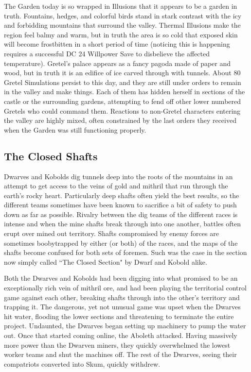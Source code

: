 The Garden today is so wrapped in Illusions that it appears to be a garden in truth. Fountains, hedges, and colorful birds stand in stark contrast with the icy and forbidding mountains that surround the valley. Thermal Illusions make the region feel balmy and warm, but in truth the area is so cold that exposed skin will become frostbitten in a short period of time (noticing this is happening requires a successful DC 24 Willpower Save to disbelieve the affected temperature). Gretel's palace appears as a fancy pagoda made of paper and wood, but in truth it is an edifice of ice carved through with tunnels. About 80 Gretel Simulations persist to this day, and they are still under orders to remain in the valley and make things. Each of them has hidden herself in sections of the castle or the surrounding gardens, attempting to fend off other lower numbered Gretels who could command them. Reactions to non-Gretel characters entering the valley are highly mixed, often constrained by the last orders they received when the Garden was still functioning properly.

\subsection{The Closed Shafts}

Dwarves and Kobolds dig tunnels deep into the roots of the mountains in an attempt to get access to the veins of gold and mithril that run through the earth's rocky heart. Particularly deep shafts often yield the best results, so the different teams sometimes have been known to sacrifice a bit of safety to push down as far as possible. Rivalry between the dig teams of the different races is intense and when the mine shafts break through into one another, battles often erupt over mined out territory. Shafts compromised by enemy forces are sometimes boobytrapped by either (or both) of the races, and the maps of the shafts become confused for both sets of foremen. Such was the case in the section now simply called ``The Closed Section" by Dwarf and Kobold alike.

Both the Dwarves and Kobolds had been digging into what promised to be an exceptionally rich vein of mithril ore, and had been playing the territorial control game against each other, breaking shafts through into the other's territory and trapping it. The dangerous, yet not unusual game was upset when the Dwarves hit water, flooding the lower sections and threatening to terminate the entire project. Undaunted, the Dwarves began setting up machinery to pump the water out. Once that started coming online, the Aboleth attacked. Having massively more power than the Dwarven miners, they quickly overwhelmed the lowest worker teams and shut the machines off. The rest of the Dwarves, seeing their compatriots converted into Skum, quickly withdrew.

